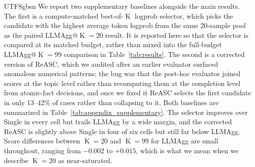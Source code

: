 \documentclass[11pt]{article}
\begin{document}
\begin{CJK*}{UTF8}{gbsn}
We report two supplementary baselines alongside the main results. The first is a compute-matched best-of-$\operatorname{K}$ logprob selector, which picks the candidate with the highest average token logprob from the same 20-sample pool as the paired LLMAgg@$\operatorname{K}{=}20$ result. It is reported here so that the selector is compared at its matched budget, rather than mixed into the full-budget LLMAgg@$\operatorname{K}{=}99$ comparison in Table~\ref{tab:results}. The second is a corrected version of ReASC, which we audited after an earlier evaluator surfaced anomalous numerical patterns; the bug was that the post-hoc evaluator joined scores at the topic level rather than recomputing them at the completion level from atomic-fact decisions, and once we fixed it ReASC selects the first candidate in only 13--42\% of cases rather than collapsing to it. Both baselines are summarized in Table~\ref{tab:appendix_supplementary}. The selector improves over Single in every cell but trails LLMAgg by a wide margin, and the corrected ReASC is slightly above Single in four of six cells but still far below LLMAgg. Score differences between $\operatorname{K}=20$ and $\operatorname{K}=99$ for LLMAgg are small throughout, ranging from $-0.002$ to $+0.015$, which is what we mean when we describe $\operatorname{K}=20$ as near-saturated.



\end{CJK*}
\end{document}
